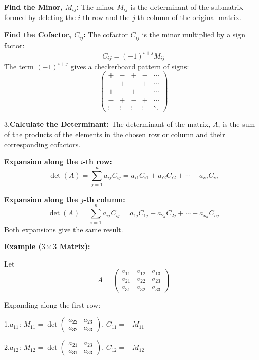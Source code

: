     \textbf{Find the Minor, \(M_{ij}\):} The minor \(M_{ij}\) is the determinant of the submatrix formed by deleting the 
    \indent \(i\)-th row and the \(j\)-th column of the original matrix.

    \textbf{Find the Cofactor, \(C_{ij}\):} The cofactor \(C_{ij}\) is the minor multiplied by a sign factor:
        \[
        C_{ij} = (-1)^{i+j} M_{ij}
        \]
        The term  \((-1)^{i+j}\)  gives a checkerboard pattern of signs:
        \[
        \begin{pmatrix}
        + & - & + & - & \cdots \\
        - & + & - & + & \cdots \\
        + & - & + & - & \cdots \\
        - & + & - & + & \cdots \\
        \vdots & \vdots & \vdots & \vdots & \ddots
        \end{pmatrix}
        \]

 3.\textbf{Calculate the Determinant:} The determinant of the matrix, \(A\), is the sum of the products of the elements in the chosen row or column and their corresponding cofactors.

    \textbf{Expansion along the \(i\)-th row:}
        \[
        \det(A) = \sum_{j=1}^{n} a_{ij} C_{ij} = a_{i1}C_{i1} + a_{i2}C_{i2} + \cdots + a_{in}C_{in}
        \]

    \textbf{Expansion along the \(j\)-th column:}
        \[
        \det(A) = \sum_{i=1}^{n} a_{ij} C_{ij} = a_{1j}C_{1j} + a_{2j}C_{2j} + \cdots + a_{nj}C_{nj}
        \]
        Both expansions give the same result.

\textbf{Example (\(3\times3\) Matrix):}

Let
\[
A = \begin{pmatrix}
a_{11} & a_{12} & a_{13} \\
a_{21} & a_{22} & a_{23} \\
a_{31} & a_{32} & a_{33}
\end{pmatrix}
\]

Expanding along the first row:

1.\(a_{11}\):  \(M_{11} = \det \begin{pmatrix} a_{22} & a_{23} \\ a_{32} & a_{33} \end{pmatrix}\),  \(C_{11} = +M_{11}\)

2.\(a_{12}\):  \(M_{12} = \det \begin{pmatrix} a_{21} & a_{23} \\ a_{31} & a_{33} \end{pmatrix}\),  \(C_{12} = -M_{12}\)

